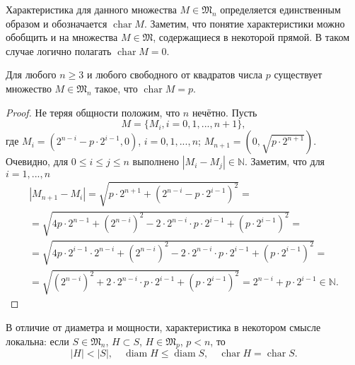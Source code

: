 Характеристика для данного множества $M\in\mathfrak{M}_n$ определяется единственным образом и обозначается $\operatorname{char}M$.
Заметим, что понятие характеристики можно обобщить и на множества $M\in\mathfrak{M}$,
содержащиеся в некоторой прямой.
В таком случае логично полагать $\operatorname{char} M = 0$.



\begin{theorem}
	\label{thm:power_char_exist}
	Для любого $n\geq 3$ и любого свободного от квадратов числа $p$
	существует множество $M\in\mathfrak{M}_n$ такое, что $\operatorname{char} M = p$.
\end{theorem}

\begin{proof}
	Не теряя общности положим, что $n$ нечётно.
	Пусть
	\begin{equation*}
		M = \{M_i, i =0,1,...,n+1\},
	\end{equation*}
	где
	$M_i = (2^{n-i}-p\cdot 2^{i-1},0)$, $i=0,1,...,n$;
	$M_{n+1} = (0,\sqrt{p \cdot 2^{n+1}})$.
	Очевидно, для $0\leqslant i \leqslant j \leqslant n$ выполнено
	$|M_i- M_j|\in\mathbb{N}$.
	Заметим, что для $i=1,...,n$
	\begin{multline*}
		|M_{n+1} - M_i| =
		\sqrt{p\cdot 2^{n+1} + (2^{n-i}-p\cdot2^{i-1})^2}
		=
		\\=
		\sqrt{4p\cdot 2^{n-1} + (2^{n-i})^2 - 2 \cdot 2^{n-i} \cdot p \cdot 2^{i-1} + (p\cdot 2^{i-1})^2}
		=
		\\=
		\sqrt{4p\cdot 2^{i-1} \cdot 2^{n-i} + (2^{n-i})^2 - 2 \cdot 2^{n-i} \cdot p \cdot 2^{i-1} + (p\cdot 2^{i-1})^2}
		=
		\\=
		\sqrt{(2^{n-i})^2 + 2 \cdot 2^{n-i} \cdot p \cdot 2^{i-1} + (p\cdot 2^{i-1})^2}
		=
		2^{n-i} + p\cdot 2^{i-1}
		\in\mathbb{N}
		.
	\end{multline*}
\end{proof}



В отличие от диаметра и мощности, характеристика в некотором смысле локальна:
если $S\in\mathfrak{M}_n$, $H \subset S$, $H\in\mathfrak{M}_{p}$, $p<n$,
то
\begin{equation*}
	|H| < |S|, \quad \operatorname{diam} H \leq \operatorname{diam} S, \quad \operatorname{char} H = \operatorname{char} S
	.
\end{equation*}
